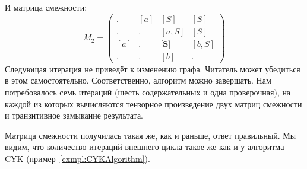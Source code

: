 \begin{example}
И матрица смежности:
\[ M_2 =
\begin{pmatrix}
. & [a] & [S] & [S] \\
. & . & [a, S] & [S] \\
[a] & . & \textbf{[S]} & [b,S] \\
. & . & [b] & .
\end{pmatrix}
\]
Следующая итерация не приведёт к изменению графа.
Читатель может убедиться в этом самостоятельно.
Соответственно, алгоритм можно завершать.
Нам потребовалось семь итераций (шесть содержательных и одна проверочная), на каждой из которых вычисляются тензорное произведение двух матриц смежности и транзитивное замыкание результата.

Матрица смежности получилась такая же, как и раньше, ответ правильный.
Мы видим, что количество итераций внешнего цикла такое же как и у алгоритма CYK (пример~\ref{exmpl:CYKAlgorithm}).

\end{example}


